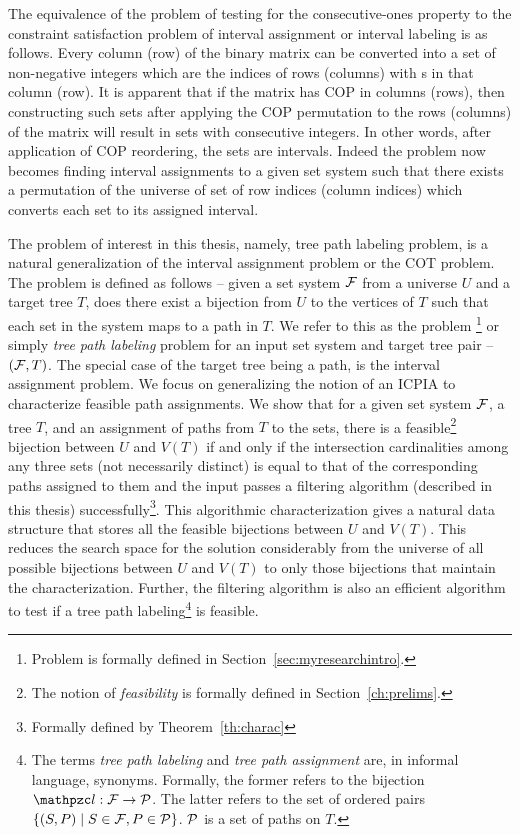 The equivalence of the problem of testing for the consecutive-ones
property to the constraint satisfaction problem of interval
assignment \cite{nsnrs09} or interval labeling \cite{kklv10} is as
follows. Every column (row) of the binary matrix can be converted into
a set of non-negative integers which are the indices of rows (columns)
with {\un}s in that column (row). It is apparent that if the matrix
has COP in columns (rows), then constructing such sets after applying
the COP permutation to the rows (columns) of the matrix will result in
sets with consecutive integers. In other words, after application of
COP reordering, the sets are intervals. Indeed the problem now becomes
finding interval assignments to a given set system such that there
exists a permutation of the universe of set of row indices (column
indices) which converts each set to its assigned interval.

The problem of interest in this thesis, namely, tree path labeling
problem, is a natural generalization of the interval assignment
problem or the COT problem. The problem is defined as follows -- given
a set system ${\cal F}$ from a universe $U$ and a target tree $T$, does
there exist a bijection from $U$ to the vertices of $T$ such that each
set in the system maps to a path in $T$.  We refer to this as the
{\CFTPL} problem \footnote{Problem is formally defined in
  Section~\ref{sec:myresearchintro}.} or simply {\em tree path
  labeling} problem for an input set system and target tree pair --
$({\cal F},T)$. The special case of the target tree being a path, is the
interval assignment problem.  We focus on generalizing the notion of
an ICPIA \cite{nsnrs09} to characterize feasible path assignments.  We
show that for a given set system ${\cal F}$, a tree $T$, and an assignment
of paths from $T$ to the sets, there is a feasible\footnote{The notion
  of {\em feasibility} is formally defined in
  Section~\ref{ch:prelims}.}  bijection between $U$ and $V(T)$ if and
only if the intersection cardinalities among any three sets (not
necessarily distinct) is equal to that of the corresponding paths
assigned to them and the input passes a filtering algorithm (described
in this thesis) successfully\footnote{Formally defined by
  Theorem~\ref{th:charac}}.  This algorithmic characterization gives a
natural data structure that stores all the feasible bijections between
$U$ and $V(T)$. This reduces the search space for the solution
considerably from the universe of all possible bijections between $U$
and $V(T)$ to only those bijections that maintain the
characterization.  Further, the filtering algorithm is also an
efficient algorithm to test if a tree path labeling\footnote{The terms
  {\em tree path labeling} and {\em tree path assignment} are, in
  informal language, synonyms. Formally, the former refers to the
  bijection $\cl: \cF \rightarrow \cP$. The latter refers to the set
  of ordered pairs $\{(S, P) \mid S \in {\cal F}, P \in {\cal P}\}$. ${\cal P}$ is a
  set of paths on $T$.} is feasible.


